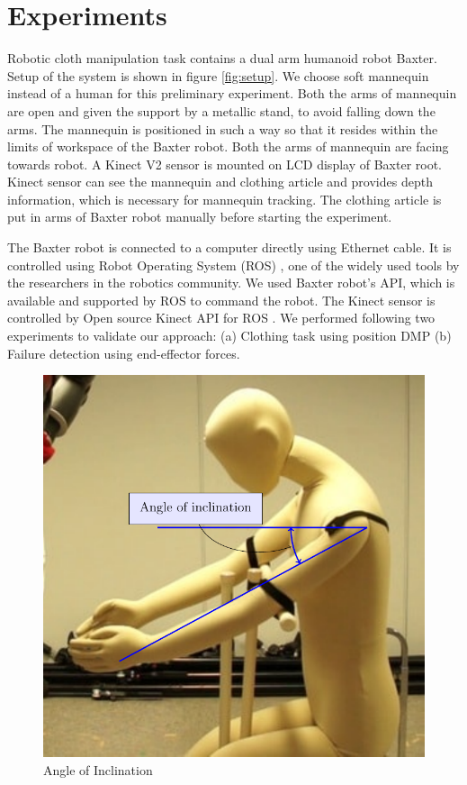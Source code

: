 \documentclass[sigconf]{acmart}
\begin{document}
\section{Experiments}
\label{sec:experiments}
Robotic cloth manipulation task contains a dual arm humanoid robot Baxter. Setup of the system is shown in figure \ref{fig:setup}. We choose soft mannequin instead of a human for this preliminary experiment. Both the arms of mannequin are open and given the support by a metallic stand, to avoid falling down the arms. The mannequin is positioned in such a way so that it resides within the limits of workspace of the Baxter robot. Both the arms of mannequin are facing towards robot. A Kinect V2 \cite{microsoft2014kinect} sensor is mounted on LCD display of Baxter root. Kinect sensor can see the mannequin and clothing article and provides depth information, which is necessary for mannequin tracking. The clothing article is put in arms of Baxter robot manually before starting the experiment.

The Baxter robot is connected to a computer directly using Ethernet cable. It is controlled using Robot Operating System (ROS) \cite{quigley2009ros}, one of the widely used tools by the researchers in the robotics community. We used Baxter robot's API, which is available and supported by ROS to command the robot. The Kinect sensor is controlled by Open source Kinect API for ROS \cite{iai_kinect2, libfreenect2}. We performed following two experiments to validate our approach: (a) Clothing task using position DMP (b) Failure detection using end-effector forces.

\begin{figure}
	\includegraphics[width=0.7\linewidth]{inclination}
	\caption{Angle of Inclination}
	\label{fig:inclination}
\end{figure}
\end{document}
